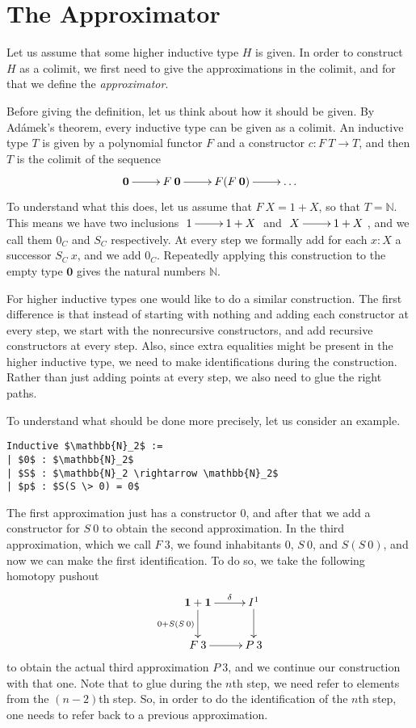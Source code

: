 \documentclass[a4paper,UKenglish]{lipics-v2016}
\newcommand{\zero}[0]{\textbf{0}}
\newcommand{\one}[0]{\textbf{1}}
\begin{document}
\section{The Approximator}
\label{sec:approximator}
Let us assume that some higher inductive type $H$ is given.
In order to construct $H$ as a colimit, we first need to give the approximations in the colimit, and for that we define the \emph{approximator}.

Before giving the definition, let us think about how it should be given.
By Ad\'amek's theorem, every inductive type can be given as a colimit.
An inductive type $T$ is given by a polynomial functor $F$ and a constructor $c : F \> T \rightarrow T$, and then $T$ is the colimit of the sequence
\[
\xymatrix
{
	\zero \ar[r] & F \> \zero  \ar[r] & F(F \> \zero) \ar[r] & \ldots
}
\]
To understand what this does, let us assume that $F \> X = 1 + X$, so that $T = \mathbb{N}$.
This means we have two inclusions  $\xymatrix{1 \ar[r] & 1+X}$ and  $\xymatrix{X \ar[r] & 1+X}$, and we call them $0_C$ and $S_C$ respectively.
At every step we formally add for each $x : X$ a successor $S_C \> x$, and we add $0_C$.
Repeatedly applying this construction to the empty type $\zero$ gives the natural numbers $\mathbb{N}$.

For higher inductive types one would like to do a similar construction.
The first difference is that instead of starting with nothing and adding each constructor at every step, we start with the nonrecursive constructors, and add recursive constructors at every step.
Also, since extra equalities might be present in the higher inductive type, we need to make identifications during the construction.
Rather than just adding points at every step, we also need to glue the right paths.

To understand what should be done more precisely, let us consider an example.
\lstset{language=Coq}
\begin{lstlisting}
Inductive $\mathbb{N}_2$ :=
| $0$ : $\mathbb{N}_2$
| $S$ : $\mathbb{N}_2 \rightarrow \mathbb{N}_2$
| $p$ : $S(S \> 0) = 0$
\end{lstlisting}
The first approximation just has a constructor $0$, and after that we add a constructor for $S \> 0$ to obtain the second approximation.
In the third approximation, which we call $F \> 3$, we found inhabitants $0$, $S \> 0$, and $S(S \> 0)$, and now we can make the first identification.
To do so, we take the following homotopy pushout
\[
\xymatrix
{
	\one + \one \ar[d]_{0 + S(S \> 0)} \ar[r]^-{\delta} & I^1 \ar[d]\\
	F \> 3\ar[r] & P \> 3
}
\]
to obtain the actual third approximation $P \> 3$, and we continue our construction with that one.
Note that to glue during the $n$th step, we need refer to elements from the $(n-2)$th step.
So, in order to do the identification of the $n$th step, one needs to refer back to a previous approximation.
\end{document}
